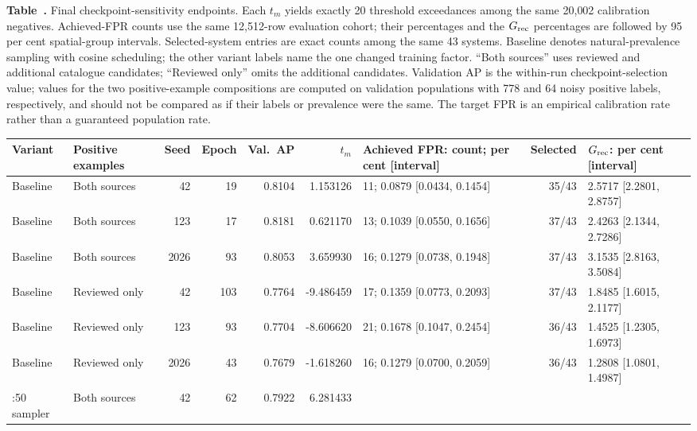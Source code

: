 \begin{table}
\label{tab:checkpoint_panel_endpoints}
\noindent\textbf{Table~\thetable.} Final checkpoint-sensitivity endpoints.
Each \(t_m\) yields exactly 20 threshold exceedances among the same 20,002
calibration negatives. Achieved-FPR counts use the same 12,512-row evaluation
cohort; their percentages and the \(G_{\rm rec}\) percentages are followed by
95 per cent spatial-group intervals. Selected-system entries are exact counts
among the same 43 systems. Baseline denotes natural-prevalence sampling with
cosine scheduling; the other variant labels name the one changed training
factor. ``Both sources'' uses reviewed and additional catalogue candidates;
``Reviewed only'' omits the additional candidates. Validation AP is the
within-run checkpoint-selection value; values for the two positive-example
compositions are computed on validation populations with 778 and 64 noisy
positive labels, respectively, and should not be compared as if their labels
or prevalence were the same. The target FPR is an empirical calibration rate
rather than a guaranteed population rate.
\begin{center}
\scriptsize
\begin{tabular}{L{0.09\textwidth}L{0.07\textwidth}r r r r
                L{0.205\textwidth}r L{0.20\textwidth}}
\toprule
Variant & Positive examples & Seed & Epoch & Val.\ AP & \(t_m\) &
Achieved FPR: count; per cent [interval] & Selected &
\(G_{\rm rec}\): per cent [interval] \\
\midrule
Baseline & Both sources & 42 & 19 & 0.8104 & 1.153126 &
11; 0.0879 [0.0434, 0.1454] & 35/43 & 2.5717 [2.2801, 2.8757] \\
Baseline & Both sources & 123 & 17 & 0.8181 & 0.621170 &
13; 0.1039 [0.0550, 0.1656] & 37/43 & 2.4263 [2.1344, 2.7286] \\
Baseline & Both sources & 2026 & 93 & 0.8053 & 3.659930 &
16; 0.1279 [0.0738, 0.1948] & 37/43 & 3.1535 [2.8163, 3.5084] \\
\addlinespace
Baseline & Reviewed only & 42 & 103 & 0.7764 & -9.486459 &
17; 0.1359 [0.0773, 0.2093] & 37/43 & 1.8485 [1.6015, 2.1177] \\
Baseline & Reviewed only & 123 & 93 & 0.7704 & -8.606620 &
21; 0.1678 [0.1047, 0.2454] & 36/43 & 1.4525 [1.2305, 1.6973] \\
Baseline & Reviewed only & 2026 & 43 & 0.7679 & -1.618260 &
16; 0.1279 [0.0700, 0.2059] & 36/43 & 1.2808 [1.0801, 1.4987] \\
:50 sampler & Both sources & 42 & 62 & 0.7922 & 6.281433 &

\end{tabular}
\end{center}
\end{table}
